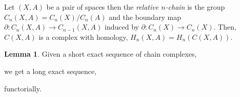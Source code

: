 \documentclass[12pt]{extarticle}
\theoremstyle{definition}
\newtheorem{lemma}[theorem]{Lemma}
\newenvironment{definition}[1][Definition:]{\begin{trivlist}
\item[\hskip \labelsep {\bfseries #1}]}{\end{trivlist}}
\begin{document}
\begin{definition}
Let $(X, A)$ be a pair of spaces then the \textit{relative $n$-chain} is the group $C_n(X, A) = C_n(X) / C_n(A)$ and the boundary map $\partial : C_n(X, A) \to C_{n-1}(X, A)$ induced by $\partial : C_n(X) \to C_n(X)$. Then, $C(X, A)$ is a complex with homology, $H_n(X, A) = H_n(C(X, A))$.  
\end{definition}

\begin{lemma}
Given a short exact sequence of chain complexes,
\begin{center}
\end{center}
we get a long exact sequence,

\begin{center}
\end{center} 

functorially.
\end{lemma}
\end{document}
